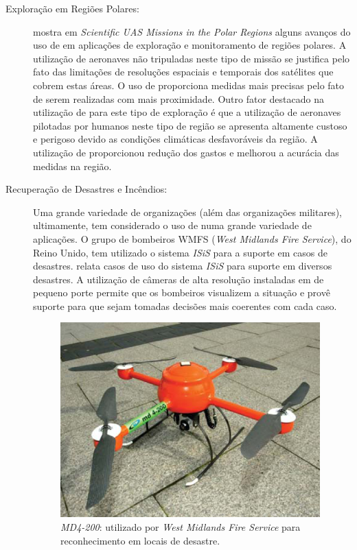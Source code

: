 \begin{description}

\item[Exploração em Regiões Polares: ]
\cite{Storvold2009} mostra em \emph{Scientific UAS Missions in the Polar Regions} alguns avanços do uso de \vants em aplicações de exploração e monitoramento de regiões polares. A utilização de aeronaves não tripuladas neste tipo de missão se justifica pelo fato das limitações de resoluções espaciais e temporais dos satélites que cobrem estas áreas. O uso de \vants proporciona medidas mais precisas pelo fato de serem realizadas com mais proximidade. Outro fator destacado na utilização de \vants para este tipo de exploração é que a utilização de
aeronaves pilotadas por humanos neste tipo de região se apresenta altamente custoso e perigoso devido as condições climáticas desfavoráveis da região. A utilização de \vants proporcionou redução dos gastos e melhorou a acurácia das medidas na região. 

\item[Recuperação de Desastres e Incêndios: ]
Uma grande variedade de organizações (além das organizações militares), ultimamente, tem considerado o uso de \vants  numa grande variedade de aplicações. O grupo de bombeiros
WMFS (\emph{West Midlands Fire Service}), do Reino Unido, tem utilizado o sistema \emph{ISiS} para a suporte em casos de desastres. \cite{Milka} relata casos de uso do sistema \emph{ISiS} para suporte em diversos desastres. A utilização de câmeras de alta resolução instaladas em \vants de pequeno porte permite que os bombeiros visualizem a situação e provê suporte para que sejam tomadas decisões mais coerentes com cada caso.

\begin{figure}[h!]
\centering
\includegraphics[width=10cm]{pictures/mq4200.png}
\caption{ \emph{MD4-200}: \vant utilizado por \emph{West Midlands Fire Service} para reconhecimento em locais de desastre. }
 \label{fig:md4-200}
\end{figure}


\end{description}
